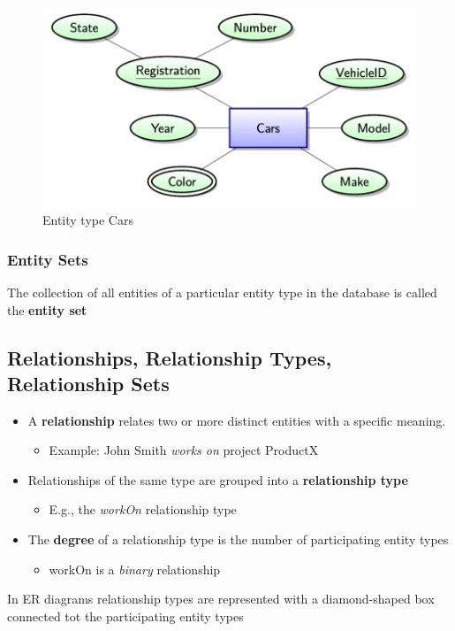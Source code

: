 \begin{figure}[H]
    \centering
    \includegraphics[width=0.5\linewidth]{images/Screenshot 2024-05-22 at 10.13.58.jpg}
    \caption{Entity type Cars}
\end{figure}
\subsubsection{Entity Sets}
The collection of all entities of a particular entity type in the database is called the \textbf{entity set}


\subsection{Relationships, Relationship Types, Relationship Sets}
\begin{itemize}[label=\(\rhd\)]
    \item A \textbf{relationship} relates two or more distinct entities with a specific meaning.
    \begin{itemize}[label=\(\rhd\)]
        \item Example: John Smith \textit{works on} project ProductX
    \end{itemize}
    \item Relationships of the same type are grouped into a \textbf{relationship type}
    \begin{itemize}[label=\(\rhd\)]
        \item E.g., the \textit{workOn} relationship type
    \end{itemize}
    \item The \textbf{degree} of a relationship type is the number of participating entity types
    \begin{itemize}[label=\(\rhd\)]
        \item workOn is a \textit{binary} relationship
    \end{itemize}
\end{itemize}

In ER diagrams relationship types are represented with a diamond-shaped box connected tot the participating entity types


